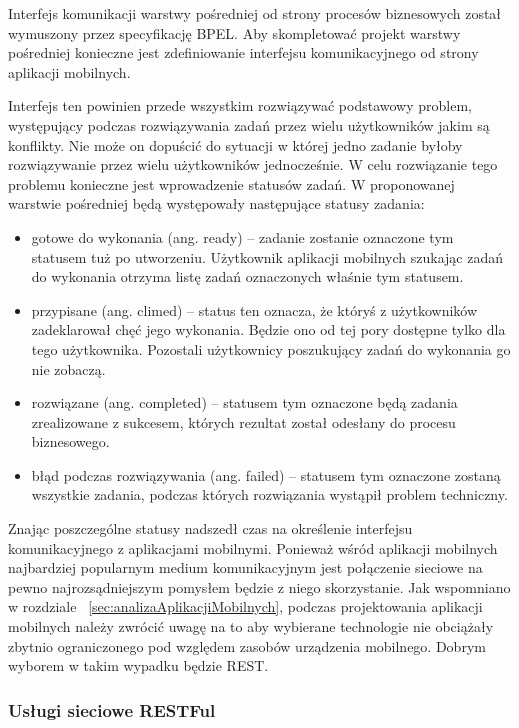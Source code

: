 Interfejs komunikacji warstwy pośredniej od strony procesów biznesowych został wymuszony przez specyfikację BPEL. Aby skompletować projekt warstwy pośredniej konieczne jest zdefiniowanie interfejsu komunikacyjnego od strony aplikacji mobilnych. 

Interfejs ten powinien przede wszystkim rozwiązywać podstawowy problem, występujący podczas rozwiązywania zadań przez wielu użytkowników jakim są konflikty. Nie może on dopuścić do sytuacji w której jedno zadanie byłoby rozwiązywanie przez wielu użytkowników jednocześnie. W celu rozwiązanie tego problemu konieczne jest wprowadzenie statusów zadań. W proponowanej warstwie pośredniej będą występowały następujące statusy zadania:

\begin{itemize}
\item gotowe do wykonania (ang. ready) -- zadanie zostanie oznaczone tym statusem tuż po utworzeniu. Użytkownik aplikacji mobilnych szukając zadań do wykonania otrzyma listę zadań oznaczonych właśnie tym statusem. 
\item przypisane (ang. climed) -- status ten oznacza, że któryś z użytkowników zadeklarował chęć jego wykonania. Będzie ono od tej pory dostępne tylko dla tego użytkownika. Pozostali użytkownicy poszukujący zadań do wykonania go nie zobaczą. 
\item rozwiązane (ang. completed) -- statusem tym oznaczone będą zadania zrealizowane z sukcesem, których rezultat został odesłany do procesu biznesowego. 
\item błąd podczas rozwiązywania (ang. failed) -- statusem tym oznaczone zostaną wszystkie zadania, podczas których rozwiązania wystąpił problem techniczny. 
\end{itemize}

Znając poszczególne statusy nadszedł czas na określenie interfejsu komunikacyjnego z aplikacjami mobilnymi. Ponieważ wśród aplikacji mobilnych najbardziej popularnym medium komunikacyjnym jest połączenie sieciowe na pewno najrozsądniejszym pomysłem będzie z niego skorzystanie. Jak wspomniano w rozdziale ~\ref{sec:analizaAplikacjiMobilnych}, podczas projektowania aplikacji mobilnych należy zwrócić uwagę na to aby wybierane technologie nie obciążały zbytnio ograniczonego pod względem zasobów urządzenia mobilnego. Dobrym wyborem w takim wypadku będzie REST. 

\subsubsection{Usługi sieciowe RESTFul}


